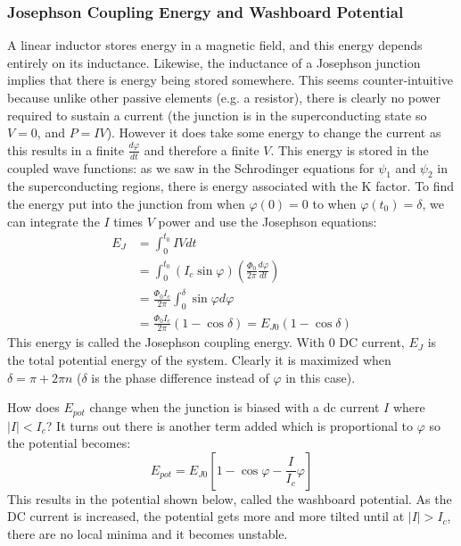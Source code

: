 \documentclass[conf]{new-aiaa}
\begin{document}
\subsubsection{Josephson Coupling Energy and Washboard Potential}
A linear inductor stores energy in a magnetic field, and this energy depends entirely on its inductance. Likewise, the inductance of a Josephson junction implies that there is energy being stored somewhere. This seems counter-intuitive because unlike other passive elements (e.g. a resistor), there is clearly no power required to sustain a current (the junction is in the superconducting state so $V = 0$, and $P = IV$). However it does take some energy to change the current as this results in a finite $\frac{d\varphi}{dt}$ and therefore a finite $V$. This energy is stored in the coupled wave functions: as we saw in the Schrodinger equations for $\psi_1$ and $\psi_2$ in the superconducting regions, there is energy associated with the K factor. To find the energy put into the junction from when $\varphi(0) = 0$ to when $\varphi(t_0) = \delta$, we can integrate the $I$ times $V$ power and use the Josephson equations: 
\begin{equation}
    \begin{split}
        E_J & = \int_{0}^{t_0} IV dt \\
        & = \int_{0}^{t_0} (I_c \sin{\varphi})(\frac{\Phi_0}{2\pi}\frac{d\varphi}{dt}) \\
        & = \frac{\Phi_0 I_c}{2\pi} \int_{0}^{\delta} \sin \varphi d\varphi \\
        & = \frac{\Phi_0 I_c}{2\pi} (1 - \cos{\delta}) = E_{J0}(1 - \cos{\delta})
    \end{split}
\end{equation}
This energy is called the Josephson coupling energy. With 0 DC current, $E_J$ is the total potential energy of the system. Clearly it is maximized when $\delta = \pi + 2\pi n$ ($\delta$ is the phase difference instead of $\varphi$ in this case). \par
How does $E_{pot}$ change when the junction is biased with a dc current $I$ where $|I| < I_c$? It turns out there is another term added which is proportional to $\varphi$ so the potential becomes: $$E_{pot} = E_{J0}[1 - \cos\varphi - \frac{I}{I_c}\varphi]$$
This results in the potential shown below, called the washboard potential. As the DC current is increased, the potential gets more and more tilted until at $|I| > I_c$, there are no local minima and it becomes unstable. 
\end{document}
